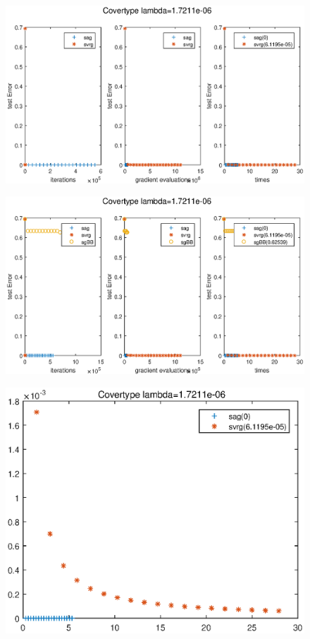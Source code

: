 \documentclass[UTF8]{ctexart}
\begin{document}
\begin{figure}[htbp]
\centering\includegraphics[width=5in]{2-n-a.eps}
\label{fig:2-n-a}
\end{figure}
\begin{figure}[htbp]
\centering\includegraphics[width=5in]{2-n-b.eps}
\label{fig:2-n-b}
\end{figure}

\begin{figure}[htbp]
\centering\includegraphics[width=5in]{2-n-c.eps}
\caption{}\label{fig:2-n-c}
\end{figure}
\end{document}
